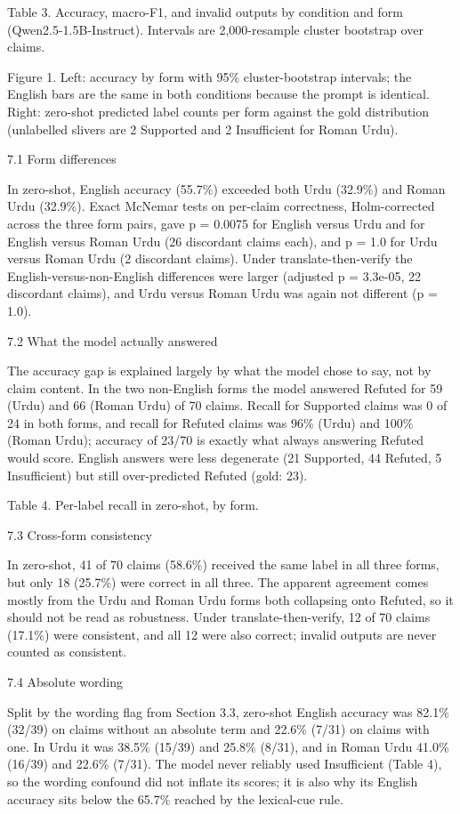 \documentclass[10pt,a4paper]{article}
\begin{document}
Table 3. Accuracy, macro-F1, and invalid outputs by condition and form (Qwen2.5-1.5B-Instruct). Intervals are 2,000-resample cluster bootstrap over claims.

Figure 1. Left: accuracy by form with 95\% cluster-bootstrap intervals; the English bars are the same in both conditions because the prompt is identical. Right: zero-shot predicted label counts per form against the gold distribution (unlabelled slivers are 2 Supported and 2 Insufficient for Roman Urdu).

7.1 Form differences

In zero-shot, English accuracy (55.7\%) exceeded both Urdu (32.9\%) and Roman Urdu (32.9\%). Exact McNemar tests on per-claim correctness, Holm-corrected across the three form pairs, gave p = 0.0075 for English versus Urdu and for English versus Roman Urdu (26 discordant claims each), and p = 1.0 for Urdu versus Roman Urdu (2 discordant claims). Under translate-then-verify the English-versus-non-English differences were larger (adjusted p = 3.3e-05, 22 discordant claims), and Urdu versus Roman Urdu was again not different (p = 1.0).

7.2 What the model actually answered

The accuracy gap is explained largely by what the model chose to say, not by claim content. In the two non-English forms the model answered Refuted for 59 (Urdu) and 66 (Roman Urdu) of 70 claims. Recall for Supported claims was 0 of 24 in both forms, and recall for Refuted claims was 96\% (Urdu) and 100\% (Roman Urdu); accuracy of 23/70 is exactly what always answering Refuted would score. English answers were less degenerate (21 Supported, 44 Refuted, 5 Insufficient) but still over-predicted Refuted (gold: 23).

Table 4. Per-label recall in zero-shot, by form.

7.3 Cross-form consistency

In zero-shot, 41 of 70 claims (58.6\%) received the same label in all three forms, but only 18 (25.7\%) were correct in all three. The apparent agreement comes mostly from the Urdu and Roman Urdu forms both collapsing onto Refuted, so it should not be read as robustness. Under translate-then-verify, 12 of 70 claims (17.1\%) were consistent, and all 12 were also correct; invalid outputs are never counted as consistent.

7.4 Absolute wording

Split by the wording flag from Section 3.3, zero-shot English accuracy was 82.1\% (32/39) on claims without an absolute term and 22.6\% (7/31) on claims with one. In Urdu it was 38.5\% (15/39) and 25.8\% (8/31), and in Roman Urdu 41.0\% (16/39) and 22.6\% (7/31). The model never reliably used Insufficient (Table 4), so the wording confound did not inflate its scores; it is also why its English accuracy sits below the 65.7\% reached by the lexical-cue rule.
\end{document}
